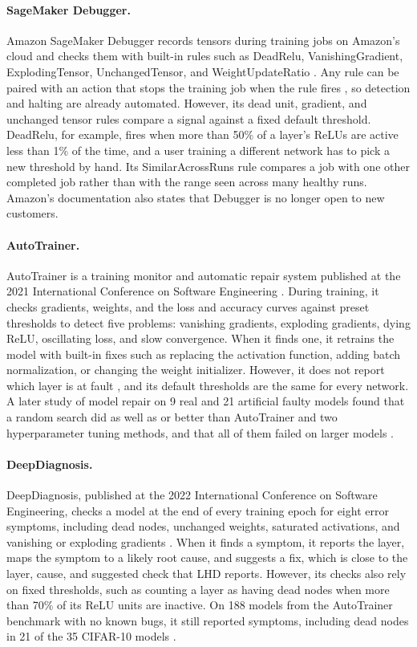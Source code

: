 \documentclass[11pt]{article}
\begin{document}
\paragraph{SageMaker Debugger.} Amazon SageMaker Debugger records tensors during training jobs on Amazon's cloud and checks them with built-in rules such as DeadRelu, VanishingGradient, ExplodingTensor, UnchangedTensor, and WeightUpdateRatio \citep{aws_rules}. Any rule can be paired with an action that stops the training job when the rule fires \citep{aws_actions}, so detection and halting are already automated. However, its dead unit, gradient, and unchanged tensor rules compare a signal against a fixed default threshold. DeadRelu, for example, fires when more than 50\% of a layer's ReLUs are active less than 1\% of the time, and a user training a different network has to pick a new threshold by hand. Its SimilarAcrossRuns rule compares a job with one other completed job rather than with the range seen across many healthy runs. Amazon's documentation also states that Debugger is no longer open to new customers.

\paragraph{AutoTrainer.} AutoTrainer is a training monitor and automatic repair system published at the 2021 International Conference on Software Engineering \citep{zhang2021}. During training, it checks gradients, weights, and the loss and accuracy curves against preset thresholds to detect five problems: vanishing gradients, exploding gradients, dying ReLU, oscillating loss, and slow convergence. When it finds one, it retrains the model with built-in fixes such as replacing the activation function, adding batch normalization, or changing the weight initializer. However, it does not report which layer is at fault \citep{wardat2022}, and its default thresholds are the same for every network. A later study of model repair on 9 real and 21 artificial faulty models found that a random search did as well as or better than AutoTrainer and two hyperparameter tuning methods, and that all of them failed on larger models \citep{kim2023}.

\paragraph{DeepDiagnosis.} DeepDiagnosis, published at the 2022 International Conference on Software Engineering, checks a model at the end of every training epoch for eight error symptoms, including dead nodes, unchanged weights, saturated activations, and vanishing or exploding gradients \citep{wardat2022}. When it finds a symptom, it reports the layer, maps the symptom to a likely root cause, and suggests a fix, which is close to the layer, cause, and suggested check that LHD reports. However, its checks also rely on fixed thresholds, such as counting a layer as having dead nodes when more than 70\% of its ReLU units are inactive. On 188 models from the AutoTrainer benchmark with no known bugs, it still reported symptoms, including dead nodes in 21 of the 35 CIFAR-10 models \citep{wardat2022}.
\end{document}
